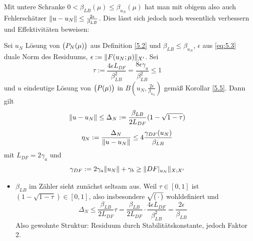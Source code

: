 \begin{bem}
	Mit untere Schranke $0 < \beta_{LB}(\mu) \leq \beta_{u_N}(\mu)$ hat man mit obigem also auch Fehlerschätzer $\|u-u_N\| \leq \frac{2\epsilon}{\beta_{LB}}$.
	Dies lässt sich jedoch noch wesentlich verbessern und Effektivitäten beweisen:
\end{bem}

\begin{satz} \label{5.6}
	Sei $u_N$ Lösung von $\big(P_N(\mu)\big)$ aus Definition \ref{5.2} und $\beta_{LB} \leq \beta_{u_N}$, $\epsilon$ aus \eqref{eq:5.3} duale Norm des Residuums, $\epsilon := \|F(u_N;\mu)\|_{X'}$.
	Sei
	\[
		\tau := \frac{4\epsilon L_{DF}}{\beta_{LB}^2} = \frac{8 \epsilon\gamma_a}{\beta_{LB}^2} \leq 1
	\]
	und $u$ eindeutige Lösung von $\big(P(\mu)\big)$ in $B(u_N,\frac{2\epsilon}{\beta_{u_N}})$ gemäß Korollar \ref{5.5}. Dann gilt
	\[
		\|u-u_N\| \leq \Delta_N := \frac{\beta_{LB}}{2 L_{DF}} (1-\sqrt{1-\tau})
	\]
	\[
		\eta_N := \frac{\Delta_N}{\|u-u_N\|} \leq 4 \frac{\gamma_{DF}(u_N)}{\beta_{LB}}
	\]
	mit $L_{DF} = 2\gamma_a$ und
	\[
		\gamma_{DF} := 2\gamma_a \|u_N\|+\gamma_b \geq \|DF|_{u_N}\|_{X;X'}
	\]
\end{satz}

\begin{bem} \beginwithlistbem
	\begin{itemize}
		\item $\beta_{LB}$ im Zähler sieht zunächst seltsam aus. Weil $\tau \in [0,1]$ ist $(1-\sqrt{1-\tau}) \in [0,1]$, also insbesondere $\sqrt{(\,\cdot\,)}$ wohldefiniert und
			\begin{equation} \label{eq:5.4}
				\Delta_N \leq \frac{\beta_{LB}}{2 L_{DF}} \tau = \frac{\beta_{LB}}{2 L_{DF}} \cdot \frac{4 \epsilon L_{DF}}{\beta_{LB}^2} = \frac{2 \epsilon}{\beta_{LB}}
			\end{equation}
			Also gewohnte Struktur: Residuum durch Stabilitätskonstante, jedoch Faktor 2.
	\end{itemize}
\end{bem}

